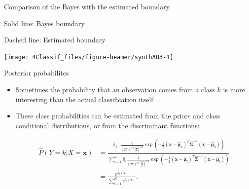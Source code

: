 \documentclass[10pt,ignorenonframetext,]{beamer}
\begin{document}
\begin{frame}

\begin{block}{Comparison of the Bayes with the estimated boundary}

\vspace{2mm}

Solid line: Bayes boundary

Dashed line: Estimated boundary \(~\)

\begin{center}\texttt{[image: 4Classif\_files/figure-beamer/synthAB3-1]} \end{center}

\end{block}

\end{frame}

\begin{frame}

\begin{block}{Posterior probabilites}

\vspace{2mm}

\begin{itemize}
\item
  Sometimes the probability that an observation comes from a class \(k\)
  is more interesting than the actual classification itself.
\item
  These class probabilities can be estimated from the priors and class
  conditional distributions, or from the discriminant functions:

  \begin{align*}\hat{P}(Y=k | X=\boldsymbol{x})&=
  \frac{\hat{\pi}_k \cdot \frac{1}{(2 \pi)^{p/2}|\hat{\boldsymbol{\Sigma}}|^{1/2}} \exp(-\frac{1}{2}
  (\boldsymbol{x}-\hat{\boldsymbol\mu}_k)^T \hat{\boldsymbol{\Sigma}}^{-1}
  (\boldsymbol{x}-\hat{\boldsymbol\mu}_k))}
  {\sum_{l=1}^K \hat{\pi}_l 
  \frac{1}{(2 \pi)^{p/2}|\hat{\boldsymbol{\Sigma}}|^{1/2}}
  \exp(-\frac{1}{2}
  (\boldsymbol{x}-\hat{\boldsymbol\mu}_l)^T 
  \hat{\boldsymbol{\Sigma}}^{-1}
  (\boldsymbol{x}-\hat{\boldsymbol\mu}_l))}\\
  &=
  \frac{e^{\hat{\delta}_k(\boldsymbol{x})}}{\sum_{l=1}^K e^{\hat{\delta}_l(\boldsymbol{x})}}.\end{align*}
\end{itemize}

\end{block}

\end{frame}
\end{document}
